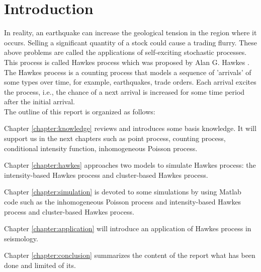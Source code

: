 \chapter{Introduction}
\label{chapter:intro}
In reality, an earthquake can increase the geological tension in the region where it occurs. Selling a significant quantity of a stock could cause a trading flurry. These above problems are called the applications of self-exciting stochastic processes. This process is called Hawkes process which was proposed by Alan G. Hawkes \cite{hawkes}. \\
The Hawkes process is a counting process that models a sequence of 'arrivals' of some types over time, for example, earthquakes, trade orders. Each arrival excites the process, i.e., the chance of a next arrival is increased for some time period after the initial arrival.\\
The outline of this report is organized as follows:

	Chapter \ref{chapter:knowledge} reviews and introduces some basis knowledge. It will support us in the next chapters such as point process, counting process, conditional intensity function, inhomogeneous Poisson process.
	
	Chapter \ref{chapter:hawkes} approaches two models to simulate Hawkes process: the intensity-based Hawkes process and cluster-based Hawkes process.
	
	Chapter \ref{chapter:simulation} is devoted to some simulations by using Matlab\textsuperscript{\textregistered} code such as the inhomogeneous Poisson process and intensity-based Hawkes process and cluster-based Hawkes process.
	
	Chapter \ref{chapter:application} will introduce an application of Hawkes process in seismology.
	
	Chapter \ref{chapter:conclusion} summarizes the content of the report what has been done and limited of its.\\
	